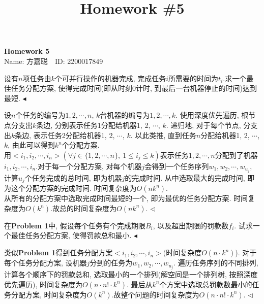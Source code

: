 \documentclass[11pt]{article}
\title{Homework \#5}
\newenvironment{problem}[2][Problem]{\begin{trivlist}
\item[\hskip \labelsep{\bfseries#1}\hskip\labelsep{\bfseries#2.}]}{\hfill$\blacktriangleleft$\end{trivlist}}
\newenvironment{answer}[1][Answer]{\begin{trivlist}
\item[\hskip \labelsep{\bfseries\itshape#1.}\hskip \labelsep]}{\hfill$\lhd$\end{trivlist}}
\begin{document}
\kaishu

\pagestyle{fancy}
\chead{}

\begin{center}
    {\LARGE \bf Homework 5}\\
    {Name: 方嘉聪\ \  ID: 2200017849}            %
\end{center}

\begin{problem}{1. (Textbook 5.9)}
    \songti
    设有$n$项任务由$k$个可并行操作的机器完成, 完成任务$i$所需要的时间为$t_i$.求一个最佳任务分配方案, 使得完成时间(即从时刻0计时, 到最后一台机器停止的时间)达到最短. 
    \label{problem_1}
\end{problem}
\begin{answer}
设$n$个任务的编号为$1,2,\cdots,n$, $k$台机器的编号为$1,2,\cdots,k$. 使用深度优先遍历, 根节点分支出$k$条边, 分别表示任务1分配给机器1, 2, $\cdots$, $k$. 递归地, 对于每个节点, 分支出$k$条边, 表示任务2分配给机器1, 2, $\cdots$, $k$. 以此类推, 直到任务$n$分配给机器1, 2, $\cdots$, $k$, 由此可以得到$k^n$个分配方案.
\\用$<i_1, i_2, \cdots, i_n>(\forall j \in \{1,2, \cdots, n\}, ~ 1\le i_j\le k)$表示任务$1, 2, \cdots, n$分配到了机器$i_1, i_2, \cdots, i_n$.对于每一个分配方案, 对每个机器$j$会得到一个任务序列$w_1, w_2, \cdots, w_{u_j}$, 计算$u_j$个任务完成的总时间, 即为机器$j$的完成时间. 从中选取最大的完成时间, 即为这个分配方案的完成时间. 时间复杂度为$O(n k^n)$.
\\从所有的分配方案中选取完成时间最短的一个, 即为最优的任务分配方案. 时间复杂度为$O(k^n)$.故总的时间复杂度为$O(n k^n)$.
\end{answer}

\begin{problem}{2. (Textbook 5.10)}
    \songti
在\textbf{Problem 1}中, 假设每个任务有个完成期限$B_i$, 以及超出期限的罚款数$f_i$. 试求一个最佳任务分配方案, 使得罚款总和最小.
\end{problem}
\begin{answer}
类似\textbf{Problem 1}得到任务分配方案$<i_1, i_2, \cdots, i_n>$(时间复杂度$O(n \cdot k^n)$). 对于每个任务分配方案, 设机器$j$分到的任务为$w_1, w_2, \cdots, w_{u_j}$. 遍历任务序列的不同排列, 计算各个顺序下的罚款总和, 选取最小的一个排列(解空间是一个排列树, 按照深度优先遍历), 时间复杂度为$O(n \cdot n! \cdot k^n)$. 最后从$k^n$个方案中选取总罚款数最小的任务分配方案, 时间复杂度为$O(k^n)$.故整个问题的时间复杂度为$O(n \cdot n! \cdot k^n)$.
\end{answer}
\end{document}
